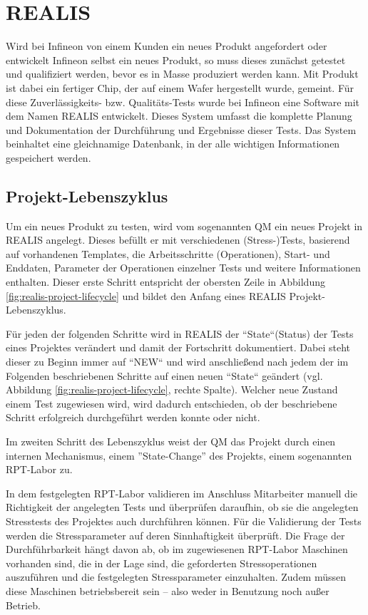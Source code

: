 \section{REALIS}\label{Sec:REALIS}
Wird bei Infineon von einem Kunden ein neues Produkt angefordert oder entwickelt Infineon selbst ein neues Produkt, so muss dieses zunächst getestet und qualifiziert werden, bevor es in Masse produziert werden kann. Mit Produkt ist dabei ein fertiger Chip, der auf einem Wafer hergestellt wurde, gemeint. Für diese Zuverlässigkeits- bzw. Qualitäts-Tests wurde bei Infineon eine Software mit dem Namen \gls{REALIS} entwickelt. Dieses System umfasst die komplette Planung und Dokumentation der Durchführung und Ergebnisse dieser Tests. Das System beinhaltet eine gleichnamige Datenbank, in der alle wichtigen Informationen gespeichert werden.

\subsection{Projekt-Lebenszyklus}\label{Subsec:project-lifecycle}
Um ein neues Produkt zu testen, wird vom sogenannten \gls{QM} ein neues Projekt in \gls{REALIS} angelegt. Dieses befüllt er mit verschiedenen (Stress-)Tests, basierend auf vorhandenen Templates, die Arbeitsschritte (Operationen), Start- und Enddaten, Parameter der Operationen einzelner Tests und weitere Informationen enthalten. Dieser erste Schritt entspricht der obersten Zeile in Abbildung \ref{fig:realis-project-lifecycle} und bildet den Anfang eines REALIS Projekt-Lebenszyklus. 

Für jeden der folgenden Schritte wird in \gls{REALIS} der ``State``(Status) der Tests eines Projektes verändert und damit der Fortschritt dokumentiert. Dabei steht dieser zu Beginn immer auf  ``NEW`` und wird anschließend nach jedem der im Folgenden beschriebenen Schritte auf einen neuen ``State`` geändert (vgl. Abbildung \ref{fig:realis-project-lifecycle}, rechte Spalte). Welcher neue Zustand einem Test zugewiesen wird, wird dadurch entschieden, ob der beschriebene Schritt erfolgreich durchgeführt werden konnte oder nicht.

Im zweiten Schritt des Lebenszyklus weist der \gls{QM} das Projekt durch einen internen Mechanismus, einem ''State-Change'' des Projekts, einem sogenannten \gls{RPT}-Labor zu. 

In dem festgelegten \gls{RPT}-Labor validieren im Anschluss Mitarbeiter manuell die Richtigkeit der angelegten Tests und überprüfen daraufhin, ob sie die angelegten Stresstests des Projektes auch durchführen können. 
Für die Validierung der Tests werden die Stressparameter auf deren Sinnhaftigkeit überprüft. Die Frage der Durchführbarkeit hängt davon ab, ob im zugewiesenen \gls{RPT}-Labor Maschinen vorhanden sind, die in der Lage sind, die geforderten Stressoperationen auszuführen und die festgelegten Stressparameter einzuhalten. Zudem müssen diese Maschinen betriebsbereit sein – also weder in Benutzung noch außer Betrieb.

